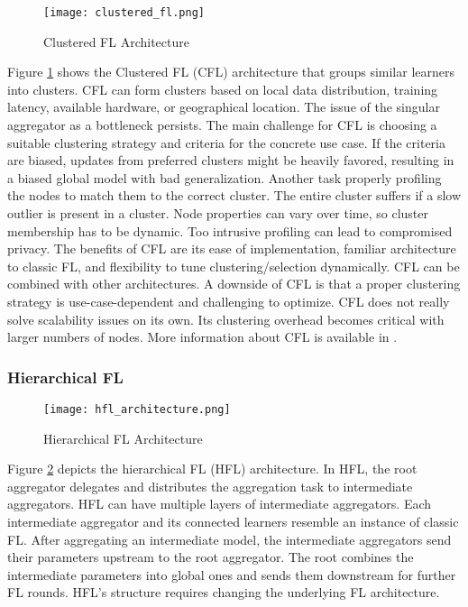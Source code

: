 \begin{figure}[b]
    \centering
    \texttt{[image: clustered\_fl.png]}
    \caption{Clustered FL Architecture}
    \label{fig:clustered_fl}
\end{figure}
Figure \ref{fig:clustered_fl} shows the Clustered FL (CFL) architecture that groups similar learners into clusters.
CFL can form clusters based on local data distribution, training latency, available hardware, or geographical location.
The issue of the singular aggregator as a bottleneck persists.
The main challenge for CFL is choosing a suitable clustering strategy and criteria for the concrete use case.
If the criteria are biased, updates from preferred clusters might be heavily favored, resulting in a biased global model with bad generalization.
Another task properly profiling the nodes to match them to the correct cluster.
The entire cluster suffers if a slow outlier is present in a cluster.
Node properties can vary over time, so cluster membership has to be dynamic.
Too intrusive profiling can lead to compromised privacy.
The benefits of CFL are its ease of implementation, familiar architecture to classic FL, and flexibility to tune clustering/selection dynamically.
CFL can be combined with other architectures.
A downside of CFL is that a proper clustering strategy is use-case-dependent and challenging to optimize.
CFL does not really solve scalability issues on its own.
Its clustering overhead becomes critical with larger numbers of nodes.
More information about CFL is available in \cite{
    paper:cluster_based_secure_aggregation_for_fl,
    paper:fedat_high_performance_communication_efficient_fl_with_asynch_tiers,
    book:fl,paper:decentralized_edge_intelligence_dynamic_resource_allocation_framework_hfl}.

\subsubsection{Hierarchical FL}
\begin{figure}[b]
    \centering
    \texttt{[image: hfl\_architecture.png]}
    \caption{Hierarchical FL Architecture}
    \label{fig:hfl_architecture}
\end{figure}
Figure \ref{fig:hfl_architecture} depicts the hierarchical FL (HFL) architecture.
In HFL, the root aggregator delegates and distributes the aggregation task to intermediate aggregators.
HFL can have multiple layers of intermediate aggregators.
Each intermediate aggregator and its connected learners resemble an instance of classic FL.
After aggregating an intermediate model, the intermediate aggregators send their parameters upstream to the root aggregator.
The root combines the intermediate parameters into global ones and sends them downstream for further FL rounds.
HFL's structure requires changing the underlying FL architecture.

